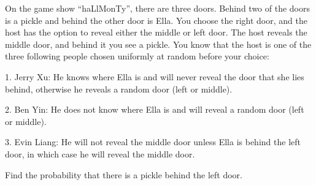 On the game show ``haLlMonTy'', there are three doors. Behind two of the doors is a pickle and behind the other door is Ella. You choose the right door, and the host has the option to reveal either the middle or left door. The host reveals the middle door, and behind it you see a pickle. You know that the host is one of the three following people chosen uniformly at random before your choice:

1. Jerry Xu: He knows where Ella is and will never reveal the door that she lies behind, otherwise he reveals a random door (left or middle).

2. Ben Yin: He does not know where Ella is and will reveal a random door (left or middle).

3. Evin Liang: He will not reveal the middle door unless Ella is behind the left door, in which case he will reveal the middle door.

Find the probability that there is a pickle behind the left door.
